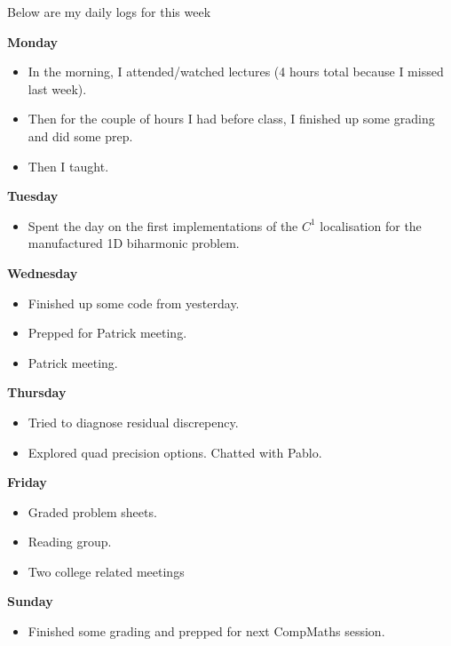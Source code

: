 \documentclass[12pt,a4paper]{article}
\begin{document}
Below are my daily logs for this week
\newline



\textbf{Monday}

\begin{itemize}
    \item In the morning, I attended/watched lectures (4 hours total because I missed last week).
    \item Then for the couple of hours I had before class, I finished up some grading and did some prep. 
    \item Then I taught.
\end{itemize}

\textbf{Tuesday}

\begin{itemize}
\item Spent the day on the first implementations of the $C^1$ localisation for the manufactured 1D biharmonic problem.
\end{itemize}

\textbf{Wednesday}

\begin{itemize}
    \item Finished up some code from yesterday.
    \item Prepped for Patrick meeting. 
    \item Patrick meeting.
\end{itemize}

\textbf{Thursday}
\begin{itemize}
    \item Tried to diagnose residual discrepency. 
    \item Explored quad precision options. Chatted with Pablo.
\end{itemize}

\textbf{Friday}

\begin{itemize}
    \item  Graded problem sheets.
    \item Reading group. 
    \item Two college related meetings
\end{itemize}


\textbf{Sunday}

\begin{itemize}
    \item Finished some grading and prepped for next CompMaths session. 
\end{itemize}
\end{document}
